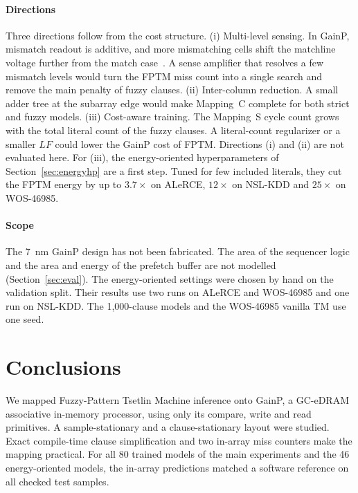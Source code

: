 \documentclass[preprint,review,12pt]{elsarticle}
\newcommand{\gainp}{GainP}
\newcommand{\hyp}[1]{#1}   %
\newcommand{\LF}{\mathit{LF}}
\newcommand{\wosnew}[1]{#1}   %
\begin{document}
\paragraph{Directions}
\hyp{Three directions follow from the cost structure.
(i) Multi-level sensing. In \gainp{}, mismatch readout is additive, and more mismatching cells shift the matchline voltage further from the match case~\cite{levi2026gainp}. A sense amplifier that resolves a few mismatch levels would turn the FPTM miss count into a single search and remove the main penalty of fuzzy clauses.
(ii) Inter-column reduction. A small adder tree at the subarray edge would make Mapping~C complete for both strict and fuzzy models.
(iii) Cost-aware training. The Mapping~S cycle count grows with the total literal count of the fuzzy clauses. A literal-count regularizer or a smaller $\LF$ could lower the \gainp{} cost of FPTM.}
Directions (i) and (ii) are not evaluated here. \wosnew{For (iii), the energy-oriented hyperparameters of Section~\ref{sec:energyhp} are a first step. Tuned for few included literals, they cut the FPTM energy by up to $3.7\times$ on ALeRCE, $12\times$ on NSL-KDD and $25\times$ on WOS-46985.}


\paragraph{Scope}
The 7~nm \gainp{} design has not been fabricated. The area of the sequencer logic and the area and energy of the prefetch buffer are not modelled (Section~\ref{sec:eval}).
The energy-oriented settings were chosen by hand on the validation split. Their results use two runs on ALeRCE and WOS-46985 and one run on NSL-KDD.
The 1,000-clause models and the WOS-46985 vanilla TM use one seed.

\section{Conclusions}\label{sec:conclusions}
\wosnew{We mapped Fuzzy-Pattern Tsetlin Machine inference onto \gainp{}, a GC-eDRAM associative in-memory processor, using only its compare, write and read primitives.
A sample-stationary and a clause-stationary layout were studied. Exact compile-time clause simplification and two in-array miss counters make the mapping practical.
For all 80 trained models of the main experiments and the 46 energy-oriented models, the in-array predictions matched a software reference on all checked test samples.}
\end{document}
